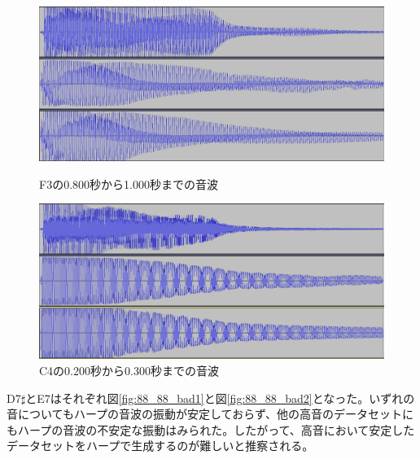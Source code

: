 \begin{figure}[b]
\begin{center}
\begin{minipage}{0.48\hsize}
\begin{center}
\includegraphics[width=0.9\hsize]{figure/88_88/f3.png}
\caption{F3の0.800秒から1.000秒までの音波}
\label{fig:88_88_good1}
\end{center}
\end{minipage}
\begin{minipage}{0.48\hsize}
\begin{center}
\includegraphics[width=0.9\hsize]{figure/88_88/c4.png}
\caption{C4の0.200秒から0.300秒までの音波}
\label{fig:88_88_good2}
\end{center}
\end{minipage}
\end{center}
\end{figure}

D7$\sharp$とE7はそれぞれ図\ref{fig:88_88_bad1}と図\ref{fig:88_88_bad2}となった。いずれの音についてもハープの音波の振動が安定しておらず、他の高音のデータセットにもハープの音波の不安定な振動はみられた。したがって、高音において安定したデータセットをハープで生成するのが難しいと推察される。

